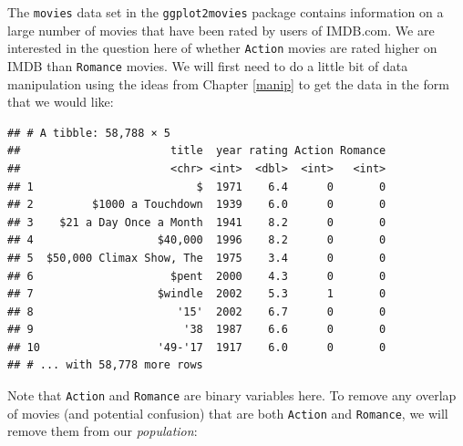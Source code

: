 \documentclass[]{tufte-book}
\newenvironment{Shaded}{\begin{snugshade}}{\end{snugshade}}
\newcommand{\KeywordTok}[1]{\textcolor[rgb]{0.13,0.29,0.53}{\textbf{{#1}}}}
\newcommand{\DecValTok}[1]{\textcolor[rgb]{0.00,0.00,0.81}{{#1}}}
\newcommand{\StringTok}[1]{\textcolor[rgb]{0.31,0.60,0.02}{{#1}}}
\newcommand{\NormalTok}[1]{{#1}}
\begin{document}
The \texttt{movies} data set in the \texttt{ggplot2movies} package
contains information on a large number of movies that have been rated by
users of IMDB.com. We are interested in the question here of whether
\texttt{Action} movies are rated higher on IMDB than \texttt{Romance}
movies. We will first need to do a little bit of data manipulation using
the ideas from Chapter \ref{manip} to get the data in the form that we
would like:

\begin{Shaded}
\end{Shaded}

\begin{verbatim}
## # A tibble: 58,788 × 5
##                       title  year rating Action Romance
##                       <chr> <int>  <dbl>  <int>   <int>
## 1                         $  1971    6.4      0       0
## 2         $1000 a Touchdown  1939    6.0      0       0
## 3    $21 a Day Once a Month  1941    8.2      0       0
## 4                   $40,000  1996    8.2      0       0
## 5  $50,000 Climax Show, The  1975    3.4      0       0
## 6                     $pent  2000    4.3      0       0
## 7                   $windle  2002    5.3      1       0
## 8                      '15'  2002    6.7      0       0
## 9                       '38  1987    6.6      0       0
## 10                  '49-'17  1917    6.0      0       0
## # ... with 58,778 more rows
\end{verbatim}

Note that \texttt{Action} and \texttt{Romance} are binary variables
here. To remove any overlap of movies (and potential confusion) that are
both \texttt{Action} and \texttt{Romance}, we will remove them from our
\emph{population}:

\begin{Shaded}
\end{Shaded}
\end{document}
